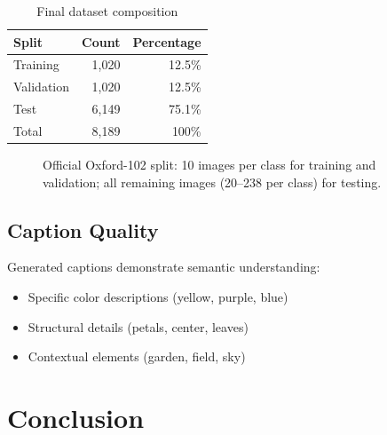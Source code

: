 \documentclass[11pt]{article}
\begin{document}
\begin{table}[!htbp]
\centering
\caption{Final dataset composition}
\begin{tabular}{lrr}
\toprule
Split & Count & Percentage \\
\midrule
Training & 1,020 & 12.5\% \\
Validation & 1,020 & 12.5\% \\
Test & 6,149 & 75.1\% \\
\midrule
Total & 8,189 & 100\% \\
\bottomrule
\end{tabular}
\end{table}

\begin{figure}[!htbp]
\centering
{}
\caption{Official Oxford-102 split: 10 images per class for training and validation; all remaining images (20--238 per class) for testing.}
\label{fig:split}
\end{figure}

\subsection{Caption Quality}

Generated captions demonstrate semantic understanding:

\begin{itemize}
    \item Specific color descriptions (yellow, purple, blue)
    \item Structural details (petals, center, leaves)
    \item Contextual elements (garden, field, sky)
\end{itemize}

\section{Conclusion}
\end{document}
